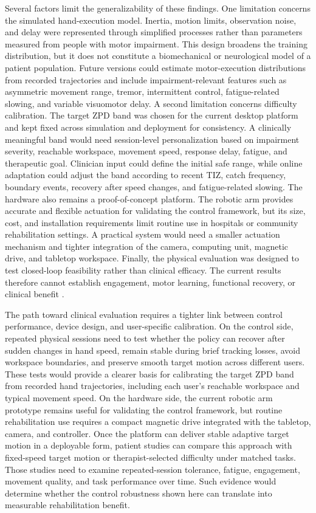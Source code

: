 \documentclass[lettersize,journal]{IEEEtran}
\begin{document}
Several factors limit the generalizability of these findings. One limitation concerns the simulated hand-execution model. Inertia, motion limits, observation noise, and delay were represented through simplified processes rather than parameters measured from people with motor impairment. This design broadens the training distribution, but it does not constitute a biomechanical or neurological model of a patient population. Future versions could estimate motor-execution distributions from recorded trajectories and include impairment-relevant features such as asymmetric movement range, tremor, intermittent control, fatigue-related slowing, and variable visuomotor delay. A second limitation concerns difficulty calibration. The target ZPD band was chosen for the current desktop platform and kept fixed across simulation and deployment for consistency. A clinically meaningful band would need session-level personalization based on impairment severity, reachable workspace, movement speed, response delay, fatigue, and therapeutic goal. Clinician input could define the initial safe range, while online adaptation could adjust the band according to recent TIZ, catch frequency, boundary events, recovery after speed changes, and fatigue-related slowing. The hardware also remains a proof-of-concept platform. The robotic arm provides accurate and flexible actuation for validating the control framework, but its size, cost, and installation requirements limit routine use in hospitals or community rehabilitation settings. A practical system would need a smaller actuation mechanism and tighter integration of the camera, computing unit, magnetic drive, and tabletop workspace. Finally, the physical evaluation was designed to test closed-loop feasibility rather than clinical efficacy. The current results therefore cannot establish engagement, motor learning, functional recovery, or clinical benefit \cite{stinearStrokeRehab2020,gomesTaskChallenge2025,boardsworthUpperLimbRobotic2025,keneaImmersiveVR2025,altawilAdaptiveVR2026}.

The path toward clinical evaluation requires a tighter link between control performance, device design, and user-specific calibration. On the control side, repeated physical sessions need to test whether the policy can recover after sudden changes in hand speed, remain stable during brief tracking losses, avoid workspace boundaries, and preserve smooth target motion across different users. These tests would provide a clearer basis for calibrating the target ZPD band from recorded hand trajectories, including each user's reachable workspace and typical movement speed. On the hardware side, the current robotic arm prototype remains useful for validating the control framework, but routine rehabilitation use requires a compact magnetic drive integrated with the tabletop, camera, and controller. Once the platform can deliver stable adaptive target motion in a deployable form, patient studies can compare this approach with fixed-speed target motion or therapist-selected difficulty under matched tasks. Those studies need to examine repeated-session tolerance, fatigue, engagement, movement quality, and task performance over time. Such evidence would determine whether the control robustness shown here can translate into measurable rehabilitation benefit.
\end{document}
